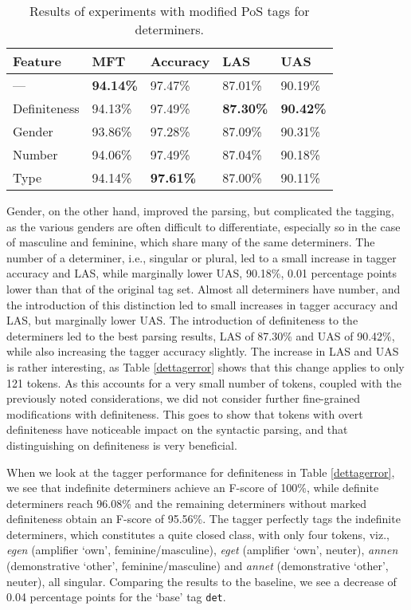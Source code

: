 \documentclass[a4paper,12pt,english]{book}
\begin{document}
\begin{table}
    \centering
    \smaller[0.5]
    \begin{tabular}{@{}lllll@{}}
        \toprule
        \textbf{Feature} & \textbf{MFT} & \textbf{Accuracy} &
        \textbf{LAS} & \textbf{UAS} \\
        \midrule
        --- & \textbf{94.14\%} & 97.47\% & 87.01\% & 90.19\% \\
        Definiteness & 94.13\% & 97.49\% & \textbf{87.30\%} &
        \textbf{90.42\%} \\
        Gender & 93.86\% & 97.28\% & 87.09\% & 90.31\% \\
        Number & 94.06\% & 97.49\% & 87.04\% & 90.18\% \\
        Type & 94.14\% & \textbf{97.61\%} & 87.00\% & 90.11\% \\
        \bottomrule
    \end{tabular}
    \caption{Results of experiments with modified PoS tags for determiners.}
    \label{detresults}
\end{table}

Gender, on the other hand, improved the parsing, but complicated the tagging,
as the various genders are often difficult to differentiate, especially so in
the case of masculine and feminine, which share many of the same determiners.
The number of a determiner, i.e., singular or plural, led to a small increase
in tagger accuracy and LAS, while marginally lower UAS, 90.18\%, 0.01
percentage points lower than that of the original tag set. Almost all
determiners have number, and the introduction of this distinction led to small
increases in tagger accuracy and LAS, but marginally lower UAS. The
introduction of definiteness to the determiners led to the best parsing
results, LAS of 87.30\% and UAS of 90.42\%, while also increasing the tagger
accuracy slightly. The increase in LAS and UAS is rather interesting, as Table
\ref{dettagerror} shows that this change applies to only 121 tokens. As this
accounts for a very small number of tokens, coupled with the previously noted
considerations, we did not consider further fine-grained modifications with
definiteness. This goes to show that tokens with overt definiteness have
noticeable impact on the syntactic parsing, and that distinguishing on
definiteness is very beneficial.

When we look at the tagger performance for definiteness in Table
\ref{dettagerror}, we see that indefinite determiners achieve an F-score of
100\%, while definite determiners reach 96.08\% and the remaining determiners
without marked definiteness obtain an F-score of 95.56\%. The tagger perfectly
tags the indefinite determiners, which constitutes a quite closed class, with
only four tokens, viz., \emph{egen} (amplifier `own', feminine/masculine),
\emph{eget} (amplifier `own', neuter), \emph{annen} (demonstrative `other',
feminine/masculine) and \emph{annet} (demonstrative `other', neuter), all
singular. Comparing the results to the baseline, we see a decrease of 0.04
percentage points for the `base' tag \texttt{det}.
\end{document}
